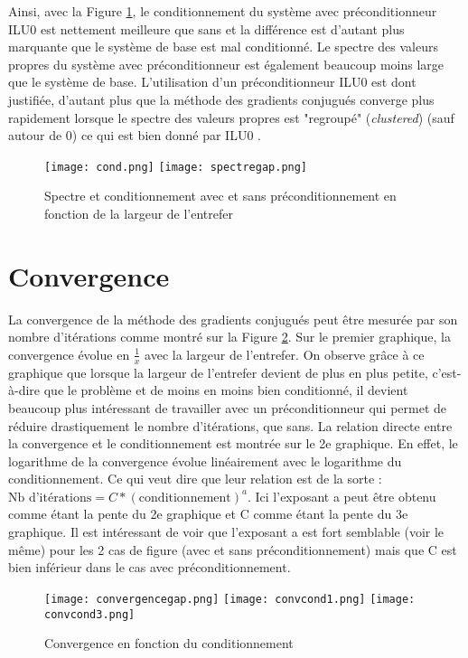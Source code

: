 \documentclass[11pt]{article}
\begin{document}
Ainsi, avec la Figure \ref{fig:spectre}, le conditionnement du système avec préconditionneur ILU0 est nettement meilleure que sans et la différence est d'autant plus marquante que le système de base est mal conditionné. Le spectre des valeurs propres du système avec préconditionneur est également beaucoup moins large que le système de base. L'utilisation d'un préconditionneur ILU0 est dont justifiée, d'autant plus que la méthode des gradients conjugués converge plus rapidement lorsque le spectre des valeurs propres est "regroupé" (\textit{clustered}) (sauf autour de 0)\cite{emory} ce qui est bien donné par ILU0 \cite{tum}. 
\begin{figure}[h!]
    \vspace*{-4mm}
    \centering
    \texttt{[image: cond.png]}
    \texttt{[image: spectregap.png]}
        \vspace*{-4mm}

    \caption{Spectre et conditionnement avec et sans préconditionnement en fonction de la largeur de l'entrefer}
    \label{fig:spectre}
\end{figure}
\vspace*{-7mm}
\section{Convergence}
La convergence de la méthode des gradients conjugués peut être mesurée par son nombre d'itérations comme montré sur la Figure \ref{fig:conv}. Sur le premier graphique, la convergence évolue en $\frac{1}{x}$ avec la largeur de l'entrefer. On observe grâce à ce graphique que lorsque la largeur de l'entrefer devient de plus en plus petite, c'est-à-dire que le problème et de moins en moins bien conditionné, il devient beaucoup plus intéressant de travailler avec un préconditionneur qui permet de réduire drastiquement le nombre d'itérations, que sans. La relation directe entre la convergence et le conditionnement est montrée sur le 2e graphique. En effet, le logarithme de la convergence évolue linéairement avec le logarithme du conditionnement. Ce qui veut dire que leur relation est de la sorte : $ \mbox{Nb d'itérations} = C * (\mbox{conditionnement})^a$. Ici l'exposant a peut être obtenu comme étant la pente du 2e graphique et C comme étant la pente du 3e graphique.
Il est intéressant de voir que l'exposant a est fort semblable (voir le même) pour les 2 cas de figure (avec et sans préconditionnement) mais que C est bien inférieur dans le cas avec préconditionnement. 
\begin{figure}[h!]
    \vspace*{-4mm}
    \centering
    \texttt{[image: convergencegap.png]}
    \hfill
    \texttt{[image: convcond1.png]}
    \hfill
    \texttt{[image: convcond3.png]}
        \vspace*{-4mm}

    \caption{Convergence en fonction du conditionnement}
    \label{fig:conv}
    \vspace*{-4mm}
\end{figure}
\end{document}
